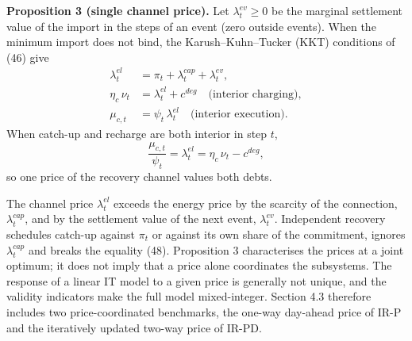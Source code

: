 \documentclass[a4paper,twocolumn,fleqn,10pt]{article}
\begin{document}
\textbf{Proposition 3 (single channel price).} Let \(\lambda^{ev}_t\ge0\) be the marginal settlement value of the import in the steps of an event (zero outside events). When the minimum import does not bind, the Karush--Kuhn--Tucker (KKT) conditions of (46) give \[\begin{aligned}\lambda^{el}_t&=\pi_t+\lambda^{cap}_t+\lambda^{ev}_t,\\\eta_c\,\nu_t&=\lambda^{el}_t+c^{deg}\quad\text{(interior charging)},\\\mu_{c,t}&=\psi_t\,\lambda^{el}_t\quad\text{(interior execution)}.\end{aligned} \tag{47}\] When catch-up and recharge are both interior in step \(t\), \[\frac{\mu_{c,t}}{\psi_t}=\lambda^{el}_t=\eta_c\,\nu_t-c^{deg}, \tag{48}\] so one price of the recovery channel values both debts.

The channel price \(\lambda^{el}_t\) exceeds the energy price by the scarcity of the connection, \(\lambda^{cap}_t\), and by the settlement value of the next event, \(\lambda^{ev}_t\). Independent recovery schedules catch-up against \(\pi_t\) or against its own share of the commitment, ignores \(\lambda^{cap}_t\) and breaks the equality (48). Proposition 3 characterises the prices at a joint optimum; it does not imply that a price alone coordinates the subsystems. The response of a linear IT model to a given price is generally not unique, and the validity indicators make the full model mixed-integer. Section 4.3 therefore includes two price-coordinated benchmarks, the one-way day-ahead price of IR-P and the iteratively updated two-way price of IR-PD.
\end{document}
